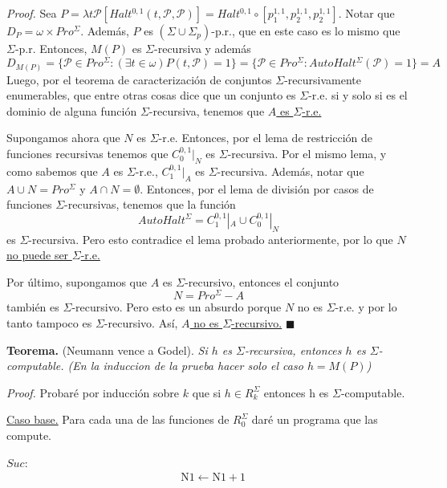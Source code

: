 \documentclass{article}
\begin{document}
\textit{Proof.} Sea $P = \lambda{t}\mathcal{P}[Halt^{0,1}(t, \mathcal{P}, \mathcal{P})] = Halt^{0,1} \circ [p^{1,1}_1, p^{1,1}_2, p^{1,1}_2]$. Notar que $D_P = \omega \times Pro^{\Sigma}$. Además, $P$ es $(\Sigma \cup \Sigma_p)$-p.r., que en este caso es lo mismo que $\Sigma$-p.r. Entonces, $M(P)$ es $\Sigma$-recursiva y además 
\[
    D_{M(P)} = \{\mathcal{P} \in Pro^{\Sigma} : (\exists t \in \omega) P(t, \mathcal{P}) = 1 \} = \{\mathcal{P} \in Pro^{\Sigma} :  AutoHalt^{\Sigma}(\mathcal{P}) = 1 \} = A
\]
Luego, por el teorema de caracterización de conjuntos $\Sigma$-recursivamente enumerables, que entre otras cosas dice que un conjunto es $\Sigma$-r.e. si y solo si es el dominio de alguna función $\Sigma$-recursiva, tenemos que \underline{$A$ es $\Sigma$-r.e.}

Supongamos ahora que $N$ es $\Sigma$-r.e. Entonces, por el lema de restricción de funciones recursivas tenemos que $C^{0,1}_0 |_{N}$ es $\Sigma$-recursiva. Por el mismo lema, y como sabemos que $A$ es $\Sigma$-r.e., $C^{0,1}_1 |_{A}$ es $\Sigma$-recursiva. Además, notar que $A \cup N = Pro^{\Sigma}$ y $A \cap N = \emptyset$. Entonces, por el lema de división por casos de funciones $\Sigma$-recursivas, tenemos que la función
\[
    AutoHalt^{\Sigma} = C^{0,1}_1 |_{A} \cup C^{0,1}_0 |_{N}
\]
es $\Sigma$-recursiva. Pero esto contradice el lema probado anteriormente, por lo que \underline{$N$ no puede ser $\Sigma$-r.e.}

Por último, supongamos que $A$ es $\Sigma$-recursivo, entonces el conjunto
\[
    N = Pro^{\Sigma} - A
\]
también es $\Sigma$-recursivo. Pero esto es un absurdo porque $N$ no es $\Sigma$-r.e. y por lo tanto tampoco es $\Sigma$-recursivo. Así, \underline{$A$ no es $\Sigma$-recursivo.}
\hfill $\blacksquare$
\vspace{4em}

\textbf{Teorema.} (Neumann vence a Godel). \textit{Si $h$ es $\Sigma$-recursiva, entonces $h$ es $\Sigma$-computable.
(En la induccion de la prueba hacer solo el caso $h = M(P)$)}

\textit{Proof.} Probaré por inducción sobre $k$ que si $h \in R^{\Sigma}_k$ entonces h es $\Sigma$-computable.

\underline{Caso base.} Para cada una de las funciones de $R^{\Sigma}_0$ daré un programa que las compute.
\vspace{1em}

\indent $Suc$:
\[
\begin{array}{ll}
    & \text{N1} \leftarrow \text{N1} + 1
\end{array}
\]
\end{document}
